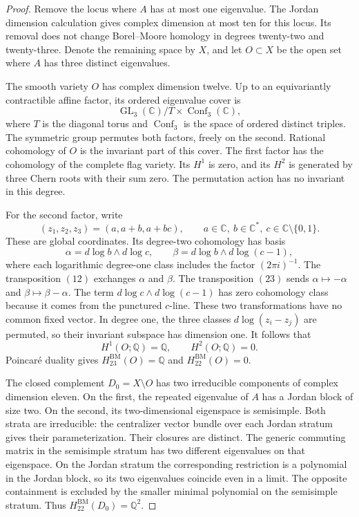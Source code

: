 \begin{proof}
Remove the locus where $A$ has at most one eigenvalue.
The Jordan dimension calculation gives complex dimension at most
ten for this locus. Its removal does not change Borel--Moore homology
in degrees twenty-two and twenty-three. Denote the remaining space
by $X$, and let $O\subset X$ be the open set where $A$ has three
distinct eigenvalues.

The smooth variety $O$ has complex dimension twelve. Up to an
equivariantly contractible affine factor, its ordered eigenvalue cover is
\[
 \operatorname{GL}_3(\mathbb C)/T\times
                  \operatorname{Conf}_3(\mathbb C),
\]
where $T$ is the diagonal torus and $\operatorname{Conf}_3$ is
the space of ordered distinct triples. The symmetric group permutes
both factors, freely on the second. Rational cohomology of $O$
is the invariant part of this cover.
The first factor has the cohomology of the complete flag variety.
Its $H^1$ is zero, and its $H^2$ is generated by three Chern roots
with their sum zero. The permutation action has no invariant in
this degree.

For the second factor, write
\[
 (z_1,z_2,z_3)=(a,a+b,a+bc),\qquad
 a\in\mathbb C,\ b\in\mathbb C^*,\
 c\in\mathbb C\setminus\{0,1\}.
\]
These are global coordinates. Its degree-two cohomology has basis
\[
 \alpha=d\log b\wedge d\log c,\qquad
 \beta=d\log b\wedge d\log(c-1),
\]
where each logarithmic degree-one class includes the factor $(2\pi i)^{-1}$.
The transposition $(12)$ exchanges $\alpha$ and $\beta$.
The transposition $(23)$ sends
$\alpha\mapsto-\alpha$ and $\beta\mapsto\beta-\alpha$.
The term $d\log c\wedge d\log(c-1)$ has zero cohomology class
because it comes from the punctured $c$-line.
These two transformations have no common fixed vector.
In degree one, the three classes $d\log(z_i-z_j)$ are permuted,
so their invariant subspace has dimension one.
It follows that
\[
 H^1(O;\mathbb Q)=\mathbb Q,\qquad H^2(O;\mathbb Q)=0.
\]
Poincar\'e duality gives
$H^{\mathrm{BM}}_{23}(O)=\mathbb Q$ and
$H^{\mathrm{BM}}_{22}(O)=0$.

The closed complement $D_0=X\setminus O$ has two irreducible
components of complex dimension eleven. On the first, the repeated
eigenvalue of $A$ has a Jordan block of size two. On the second,
its two-dimensional eigenspace is semisimple.
Both strata are irreducible: the centralizer vector bundle over
each Jordan stratum gives their parameterization.
Their closures are distinct. The generic commuting matrix in the
semisimple stratum has two different eigenvalues on that eigenspace.
On the Jordan stratum the corresponding restriction is a polynomial
in the Jordan block, so its two eigenvalues coincide even in a limit.
The opposite containment is excluded by the smaller minimal polynomial
on the semisimple stratum. Thus
$H^{\mathrm{BM}}_{22}(D_0)=\mathbb Q^2$.


\end{proof}
